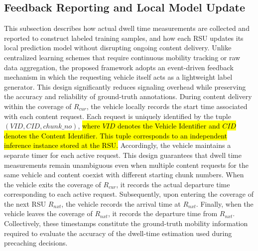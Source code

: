\documentclass[journal]{IEEEtran}
\begin{document}
\subsection{Feedback Reporting and Local Model Update}\label{subsec:4}
This subsection describes how actual dwell time measurements are collected and reported to construct labeled training samples, and how each RSU updates its local prediction model without disrupting ongoing content delivery.
Unlike centralized learning schemes that require continuous mobility tracking or raw data aggregation, the proposed framework adopts an event-driven feedback mechanism in which the requesting vehicle itself acts as a lightweight label generator.
This design significantly reduces signaling overhead while preserving the accuracy and reliability of ground-truth annotations.
During content delivery within the coverage of $R_{cur}$, the vehicle locally records the start time associated with each content request.
Each request is uniquely identified by the tuple $(VID, CID, chunk\_no)$, \hl{where $VID$ denotes the Vehicle Identifier and $CID$ denotes the Content Identifier. This tuple corresponds to an independent inference instance stored at the RSU.}
Accordingly, the vehicle maintains a separate timer for each active request.
This design guarantees that dwell time measurements remain unambiguous even when multiple content requests for the same vehicle and content coexist with different starting chunk numbers.
When the vehicle exits the coverage of $R_{cur}$, it records the actual departure time corresponding to each active request.
Subsequently, upon entering the coverage of the next RSU $R_{nxt}$, the vehicle records the arrival time at $R_{nxt}$.
Finally, when the vehicle leaves the coverage of $R_{nxt}$, it records the departure time from $R_{nxt}$.
Collectively, these timestamps constitute the ground-truth mobility information required to evaluate the accuracy of the dwell-time estimation used during precaching decisions.
\end{document}
